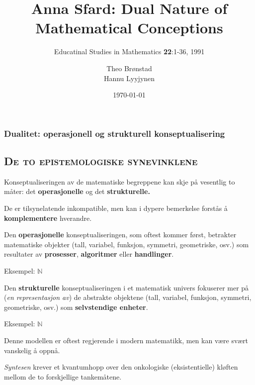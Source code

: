 \documentclass[xcolor=x11names,compress]{beamer}
\renewcommand{\(}{\begin{columns}}
\renewcommand{\)}{\end{columns}}
\newcommand{\<}[1]{\begin{column}{#1}}
\renewcommand{\>}{\end{column}}
\begin{document}

\begin{frame}
\title{Anna Sfard: Dual Nature of Mathematical Conceptions}
\subtitle{Educatinal Studies in Mathematics {\bf 22}:1-36, 1991}
\author{
          Theo Brønstad \\
	Hannu Lyyjynen	 
        }
        \date{\today} 
	\begin{figure}
          \centering
        \end{figure}
\titlepage
\end{frame}
 \begin{frame}
\frametitle{Dualitet: operasjonell og strukturell konseptualisering}
\tableofcontents
\end{frame}
%
\begin{frame}
\section{\scshape De to epistemologiske synevinklene}
      Konseptualiseringen av de matematiske begreppene kan skje på  
vesentlig  to måter:
      det {\bf operasjonelle} og det {\bf strukturelle.} 
      
      De er tilsynelatende inkompatible, men kan i dypere bemerkelse 
forstås å {\bf komplementere} hverandre.
\end{frame}
%
%
\begin{frame}
      Den {\bf operasjonelle} konseptualiseringen, som oftest kommer først, 
betrakter matematiske objekter 
(tall, variabel, funksjon, symmetri, geometriske, osv.) 
som resultater av 
{\bf prosesser}, {\bf algoritmer} eller {\bf handlinger}.     

Eksempel: $ \mathbb{N}$
\end{frame}
%
%
\begin{frame}
      Den {\bf strukturelle} konseptualiseringen i et matematisk univers
fokuserer mer på ({\it en representasjon av}) 
de abstrakte objektene (tall, variabel, funksjon, symmetri, geometriske, osv.)
som {\bf selvstendige enheter}.  

Eksempel: $ \mathbb{N}$ \pause

     Denne modellen er oftest regjerende i modern matematikk, 
men kan være svært vanskelig å oppnå.   
 
    {\it Syntesen} krever et kvantumhopp over den onkologiske (eksistentielle)
 kløften mellom de to forskjellige tankemåtene.
\end{frame}
\end{document}
